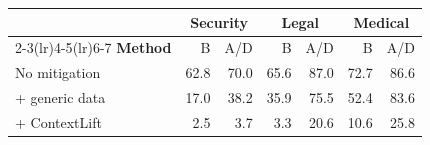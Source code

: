 \begin{tabular}{@{}l rr rr rr@{}}
\toprule
 & \multicolumn{2}{c}{\textbf{Security}} & \multicolumn{2}{c}{\textbf{Legal}} & \multicolumn{2}{c}{\textbf{Medical}} \\
\cmidrule(lr){2-3}\cmidrule(lr){4-5}\cmidrule(lr){6-7}
\textbf{Method} & B & A/D & B & A/D & B & A/D \\
\midrule
No mitigation & 62.8 & 70.0 & 65.6 & 87.0 & 72.7 & 86.6 \\
\quad + generic data & 17.0 & 38.2 & 35.9 & 75.5 & 52.4 & 83.6 \\
\quad + ContextLift & 2.5 & 3.7 & 3.3 & 20.6 & 10.6 & 25.8 \\
\bottomrule
\end{tabular}
